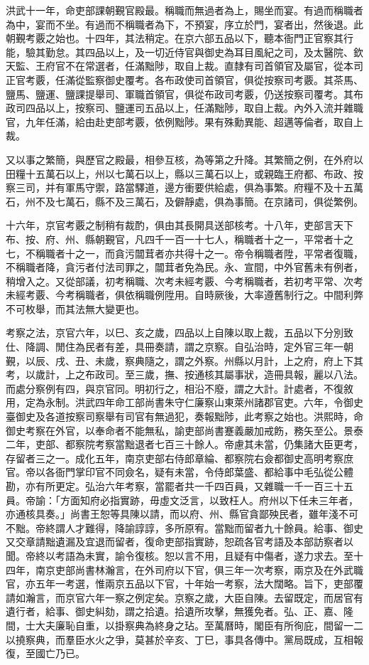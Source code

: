 洪武十一年，命吏部課朝覲官殿最。稱職而無過者為上，賜坐而宴。有過而稱職者為中，宴而不坐。有過而不稱職者為下，不預宴，序立於門，宴者出，然後退。此朝覲考覈之始也。十四年，其法稍定。在京六部五品以下，聽本衙門正官察其行能，驗其勤怠。其四品以上，及一切近侍官與御史為耳目風紀之司，及太醫院、欽天監、王府官不在常選者，任滿黜陟，取自上裁。直隸有司首領官及屬官，從本司正官考覈，任滿從監察御史覆考。各布政使司首領官，俱從按察司考覈。其茶馬、鹽馬、鹽運、鹽課提舉司、軍職首領官，俱從布政司考覈，仍送按察司覆考。其布政司四品以上，按察司、鹽運司五品以上，任滿黜陟，取自上裁。內外入流并雜職官，九年任滿，給由赴吏部考覈，依例黜陟。果有殊勳異能、超邁等倫者，取自上裁。

又以事之繁簡，與歷官之殿最，相參互核，為等第之升降。其繁簡之例，在外府以田糧十五萬石以上，州以七萬石以上，縣以三萬石以上，或親臨王府都、布政、按察三司，并有軍馬守禦，路當驛道，邊方衝要供給處，俱為事繁。府糧不及十五萬石，州不及七萬石，縣不及三萬石，及僻靜處，俱為事簡。在京諸司，俱從繁例。

十六年，京官考覈之制稍有裁酌，俱由其長開具送部核考。十八年，吏部言天下布、按、府、州、縣朝覲官，凡四千一百一十七人，稱職者十之一，平常者十之七，不稱職者十之一，而貪污闒茸者亦共得十之一。帝令稱職者陞，平常者復職，不稱職者降，貪污者付法司罪之，闒茸者免為民。永、宣間，中外官舊未有例者，稍增入之。又從部議，初考稱職、次考未經考覈、今考稱職者，若初考平常、次考未經考覈、今考稱職者，俱依稱職例陞用。自時厥後，大率遵舊制行之。中間利弊不可枚舉，而其法無大變更也。

考察之法，京官六年，以巳、亥之歲，四品以上自陳以取上裁，五品以下分別致仕、降調、閒住為民者有差，具冊奏請，謂之京察。自弘治時，定外官三年一朝覲，以辰、戌、丑、未歲，察典隨之，謂之外察。州縣以月計，上之府，府上下其考，以歲計，上之布政司。至三歲，撫、按通核其屬事狀，造冊具報，麗以八法。而處分察例有四，與京官同。明初行之，相沿不廢，謂之大計。計處者，不復敘用，定為永制。洪武四年命工部尚書朱守仁廉察山東萊州諸郡官吏。六年，令御史臺御史及各道按察司察舉有司官有無過犯，奏報黜陟，此考察之始也。洪熙時，命御史考察在外官，以奉命者不能無私，諭吏部尚書蹇義嚴加戒飭，務矢至公。景泰二年，吏部、都察院考察當黜退者七百三十餘人。帝慮其未當，仍集諸大臣更考，存留者三之一。成化五年，南京吏部右侍郎章綸、都察院右僉都御史高明考察庶官。帝以各衙門掌印官不同僉名，疑有未當，令侍郎葉盛、都給事中毛弘從公體勘，亦有所更定。弘治六年考察，當罷者共一千四百員，又雜職一千一百三十五員。帝諭：「方面知府必指實跡，毋虛文泛言，以致枉人。府州以下任未三年者，亦通核具奏。」尚書王恕等具陳以請，而以府、州、縣官貪鄙殃民者，雖年淺不可不黜。帝終謂人才難得，降諭諄諄，多所原宥。當黜而留者九十餘員。給事、御史又交章請黜遺漏及宜退而留者，復命吏部指實跡，恕疏各官考語及本部訪察者以聞。帝終以考語為未實，諭令復核。恕以言不用，且疑有中傷者，遂力求去。至十四年，南京吏部尚書林瀚言，在外司府以下官，俱三年一次考察，兩京及在外武職官，亦五年一考選，惟兩京五品以下官，十年始一考察，法大闊略。旨下，吏部覆請如瀚言，而京官六年一察之例定矣。京察之歲，大臣自陳。去留既定，而居官有遺行者，給事、御史糾劾，謂之拾遺。拾遺所攻擊，無獲免者。弘、正、嘉、隆間，士大夫廉恥自重，以掛察典為終身之玷。至萬曆時，閣臣有所徇庇，間留一二以撓察典，而羣臣水火之爭，莫甚於辛亥、丁巳，事具各傳中。黨局既成，互相報復，至國亡乃已。

